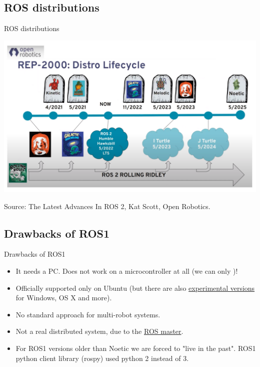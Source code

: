 \documentclass{beamer}
\begin{document}
\subsection{ROS distributions}
\begin{frame}{ROS distributions}
    
      \centering
    \includegraphics[width=1
    \linewidth]{figures/ROS_distros.png}
    
\tiny{Source: The Latest Advances In ROS 2, Kat Scott, Open Robotics. }
\end{frame}

\subsection{Drawbacks of ROS1}
\begin{frame}{Drawbacks of ROS1}
    \begin{itemize}
        \item It needs a PC. Does not work on a microcontroller at all (we can only  {})!
        \item Officially supported only on Ubuntu (but there are also {\color{blue}\href{http://wiki.ROS.org/Installation}{experimental versions}} for Windows, OS X and more).
        \item No standard approach for multi-robot systems.
        \item Not a real distributed system, due to the {\color{blue}\href{https://roboticsbackend.com/ROS21-vs-ROS22-practical-overview/\#No_more_ros_master}{ROS master}}.
        \item For ROS1 versions older than Noetic we are forced to "live in the past". ROS1 python client library (rospy) used python 2 instead of 3.
    \end{itemize}  
\end{frame}
\end{document}
